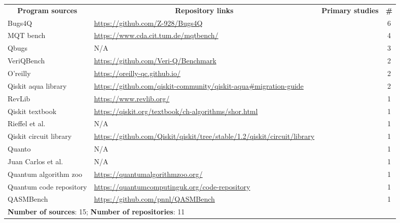 
\begin{tabular}{p{}  p{} p{} c}
    \toprule[1pt]
    \multicolumn{1}{c}{\textbf{Program sources}} & \multicolumn{1}{c}{\textbf{Repository links}} & \multicolumn{1}{c}{\textbf{Primary studies}} & \multicolumn{1}{c}{\textbf{\#}} \\
    \cmidrule(lr){1-1} \cmidrule(lr){2-2} \cmidrule(lr){3-3} \cmidrule(lr){4-4}  
    Bugs4Q~\cite{zhao2021bugs4q} & {\url{https://github.com/Z-928/Bugs4Q}} & \cite{\PaperFortyFour ,\PaperFortyFive ,\PaperFiftyOne ,\PaperEightyThree ,\PaperEightyFour ,\PaperOneHundredAndNine} & 6 \\ 
    MQT bench~\cite{quetschlich2023mqt} & {\url{https://www.cda.cit.tum.de/mqtbench/}} & \cite{\PaperThirtyNine ,\PaperFiftyFour ,\PaperSeventyEight ,\PaperOneHundredAndTwelve} & 4 \\ 
    Qbugs~\cite{campos2021qbugs} & N/A & \cite{\PaperFortyFour ,\PaperEightyThree ,\PaperEightyFour} & 3 \\ 
    VeriQBench~\cite{chen2022VeriQBench} & {\url{https://github.com/Veri-Q/Benchmark}} & \cite{\PaperSix ,\PaperFiftyTwo} & 2 \\ 
    O'reilly~\cite{johnston2019programming} & {\url{https://oreilly-qc.github.io/}} & \cite{\PaperTwentySeven ,\PaperFiftyNine} & 2 \\ 
    Qiskit aqua library & {\url{https://github.com/qiskit-community/qiskit-aqua#migration-guide}} & \cite{\PaperSeventyFour ,\PaperOneHundredAndNine} & 2 \\ 
    RevLib~\cite{wille2008revlib} & {\url{https://www.revlib.org/}} & \cite{\PaperFifteen} & 1 \\ 
    Qiskit textbook & {\url{https://qiskit.org/textbook/ch-algorithms/shor.html}} & \cite{\PaperTwentySeven} & 1 \\ 
    Rieffel et al.~\cite{rieffel2011quantum} & N/A & \cite{\PaperFortyThree} & 1 \\ 
    Qiskit circuit library & {\url{https://github.com/Qiskit/qiskit/tree/stable/1.2/qiskit/circuit/library}} & \cite{\PaperFortySix} & 1 \\ 
    Quanto~\cite{pointing2024optimizing} & N/A & \cite{\PaperSeventy} & 1 \\ 
    Juan Carlos et al.~\cite{garcia2011equivalent} & N/A & \cite{\PaperSeventy} & 1 \\ 
    Quantum algorithm zoo & {\url{https://quantumalgorithmzoo.org/}} & \cite{\PaperSeventyThree} & 1 \\ 
    Quantum code repository & {\url{https://quantumcomputinguk.org/code-repository}} & \cite{\PaperSeventyThree} & 1 \\ 
    QASMBench~\cite{li2023qasmbench} & {\url{https://github.com/pnnl/QASMBench}} & \cite{\PaperEightyFour} & 1 \\
    \cmidrule(lr){1-4} 
    \multicolumn{4}{l}{\textbf{Number of sources}: 15; \textbf{Number of repositories}: 11} \\   
    \bottomrule[1pt]
\end{tabular}
        